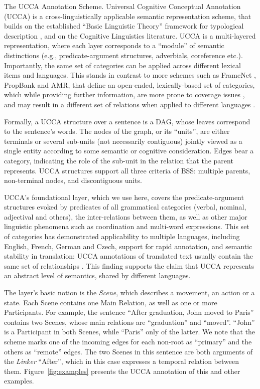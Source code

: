 \documentclass[11pt]{article}
\makeatletter
\newcommand{\figref}[1]{Figure~\ref{#1}}
\renewcommand{\paragraph}{
  \@startsection{paragraph}{4}
  {\z@}{.5ex \@plus .5ex \@minus .2ex}{-1em}
  {\normalfont\normalsize\bfseries}
}
\makeatother
\begin{document}
\paragraph{The UCCA Annotation Scheme.}
Universal Cognitive Conceptual Annotation (UCCA)
is a cross-linguistically applicable semantic representation scheme,
that builds on the established ``Basic Linguistic Theory'' framework for typological description
\cite{Dixon:10b,Dixon:10a,Dixon:12}, and on the Cognitive Linguistics literature.
UCCA is a multi-layered representation, where each layer corresponds to a ``module'' of
semantic distinctions (e.g., predicate-argument structures, adverbials, coreference etc.).
Importantly, the same set of categories can be applied across different lexical items and languages.
This stands in contrast to more schemes such as FrameNet \cite{Baker:98},
PropBank \cite{Palmer:05} and AMR, that define an open-ended, lexically-based set of categories,
which while providing further information, are more prone to coverage issues \cite{Palmer:10},
and may result in a different set of relations when applied to different languages \cite{Xue2014not}.

Formally, a UCCA structure over a sentence is a DAG, whose leaves correspond to the sentence's words.
The nodes of the graph, or its ``units'', are either terminals or several
sub-units (not necessarily contiguous) jointly viewed as a
single entity according to some semantic or cognitive consideration.
Edges bear a category, indicating the role of the sub-unit in the relation that the parent represents.
UCCA structures support all three criteria of BSS: multiple parents, non-terminal nodes, and discontiguous units.

UCCA's foundational layer, which we use here, covers the predicate-argument
structures evoked by predicates of all grammatical categories
(verbal, nominal, adjectival and others), the inter-relations between them,
as well as other major linguistic phenomena such as coordination and multi-word expressions.
This set of categories has demonstrated applicability to multiple languages, including
English, French, German and Czech, support for rapid annotation, and semantic stability in translation:
UCCA annotations of translated text usually contain the same set of relationships
\cite{sulem2015conceptual}. This finding supports the claim that UCCA represents an abstract
level of semantics, shared by different languages.

The layer's basic notion is the {\it Scene}, which describes a movement, an action or a state.
Each Scene contains one Main Relation, as well as one or more Participants.
For example, the sentence ``After graduation, John moved to Paris'' contains two Scenes,
whose main relations are ``graduation'' and ``moved''. ``John'' is a Participant in both Scenes,
while ``Paris'' only of the latter.
We note that the scheme marks one of the incoming edges for each non-root
as ``primary'' and the others as ``remote'' edges.
The two Scenes in this sentence are both arguments of the \textit{Linker} ``After'',
which in this case expresses a temporal relation between them.
\figref{fig:examples} presents the UCCA annotation of this and other examples.
\end{document}
